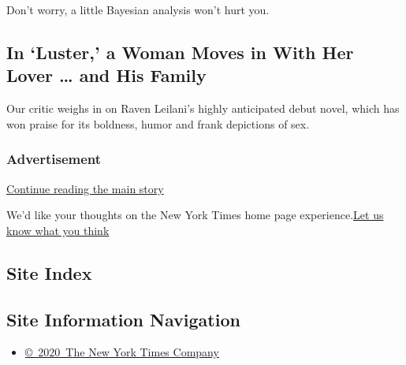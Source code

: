 Don't worry, a little Bayesian analysis won't hurt you.

\href{/2020/08/04/science/coronavirus-bayes-statistics-math.html}{}

\href{/2020/08/04/books/review-luster-raven-leilani.html}{}

\hypertarget{in-luster-a-woman-moves-in-with-her-lover--and-his-family}{%
\subsection{In `Luster,' a Woman Moves in With Her Lover \ldots{} and
His
Family}\label{in-luster-a-woman-moves-in-with-her-lover--and-his-family}}

Our critic weighs in on Raven Leilani's highly anticipated debut novel,
which has won praise for its boldness, humor and frank depictions of
sex.

\href{/2020/08/04/books/review-luster-raven-leilani.html}{}

\hypertarget{advertisement}{%
\subsubsection{Advertisement}\label{advertisement}}

\protect\hyperlink{after-dfp-ad-mid1-large}{Continue reading the main
story}

We'd like your thoughts on the New York Times home page
experience.\href{http://nyt.qualtrics.com/jfe/form/SV_eFJmKj9v0krSE0l}{Let
us know what you think}

\hypertarget{site-index}{%
\subsection{Site Index}\label{site-index}}

\hypertarget{site-information-navigation}{%
\subsection{Site Information
Navigation}\label{site-information-navigation}}

\begin{itemize}
\tightlist
\item
  \href{https://help.nytimes3xbfgragh.onion/hc/en-us/articles/115014792127-Copyright-notice}{©~2020~The
  New York Times Company}
\end{itemize}


